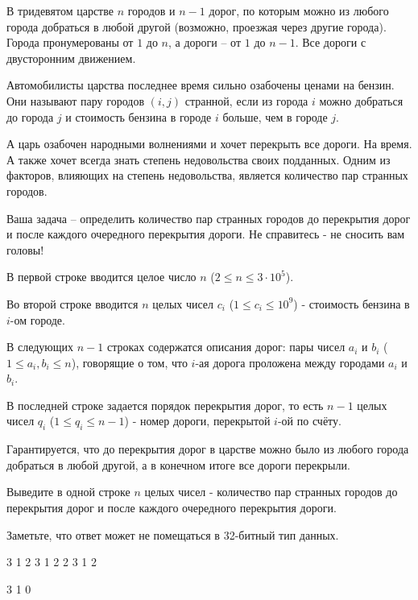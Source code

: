 
В тридевятом царстве $n$ городов и $n - 1$ дорог, по которым можно из любого города добраться в любой другой (возможно, проезжая через другие города). Города пронумерованы от $1$ до $n$, а дороги -- от $1$ до $n - 1$. Все дороги с двусторонним движением.

Автомобилисты царства последнее время сильно озабочены ценами на бензин. Они называют пару городов $(i, j)$ странной, если из города $i$ можно добраться до города $j$ и стоимость бензина в городе $i$ больше, чем в городе $j$.

А царь озабочен народными волнениями и хочет перекрыть все дороги. На время. А также хочет всегда знать степень недовольства своих подданных. Одним из факторов, влияющих на степень недовольства, является количество пар странных городов.

Ваша задача -- определить количество пар странных городов до перекрытия дорог и после каждого очередного перекрытия дороги. Не справитесь - не сносить вам головы!


В первой строке вводится целое число $n$ ($2 \le n \le 3 \cdot 10^5$).

Во второй строке вводится $n$ целых чисел $c_i$ ($1 \le c_i \le 10^9$) - стоимость бензина в $i$-ом городе.

В следующих $n - 1$ строках содержатся описания дорог: пары чисел $a_i$ и $b_i$ \linebreak ($1 \le a_i, b_i \le n$), говорящие о том, что $i$-ая дорога проложена между городами $a_i$ и $b_i$.

В последней строке задается порядок перекрытия дорог, то есть $n - 1$ целых чисел $q_i$ ($1 \le q_i \le n-1$) - номер дороги, перекрытой $i$-ой по счёту.

Гарантируется, что до перекрытия дорог в царстве можно было из любого города добраться в любой другой, а в конечном итоге все дороги перекрыли.

\outputfmtSection

Выведите в одной строке $n$ целых чисел - количество пар странных городов до перекрытия дорог и после каждого очередного перекрытия дороги.

Заметьте, что ответ может не помещаться в 32-битный тип данных.

\exampleSection


\begin{myverbbox}[\small]{\vinput}
3
1 2 3
1 2
2 3
1 2
\end{myverbbox}
\begin{myverbbox}[\small]{\voutput}
3 1 0
\end{myverbbox}

